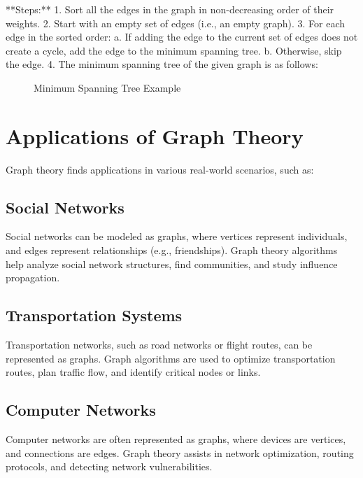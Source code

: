 \documentclass{article}
\begin{document}
**Steps:**
1. Sort all the edges in the graph in non-decreasing order of their weights.
2. Start with an empty set of edges (i.e., an empty graph).
3. For each edge in the sorted order:
   a. If adding the edge to the current set of edges does not create a cycle, add the edge to the minimum spanning tree.
   b. Otherwise, skip the edge.
4. The minimum spanning tree of the given graph is as follows:

\begin{figure}[h]
    \centering
    \caption{Minimum Spanning Tree Example}
\end{figure}

\section{Applications of Graph Theory}
Graph theory finds applications in various real-world scenarios, such as:

\subsection{Social Networks}
Social networks can be modeled as graphs, where vertices represent individuals, and edges represent relationships (e.g., friendships). Graph theory algorithms help analyze social network structures, find communities, and study influence propagation.

\subsection{Transportation Systems}
Transportation networks, such as road networks or flight routes, can be represented as graphs. Graph algorithms are used to optimize transportation routes, plan traffic flow, and identify critical nodes or links.

\subsection{Computer Networks}
Computer networks are often represented as graphs, where devices are vertices, and connections are edges. Graph theory assists in network optimization, routing protocols, and detecting network vulnerabilities.
\end{document}
